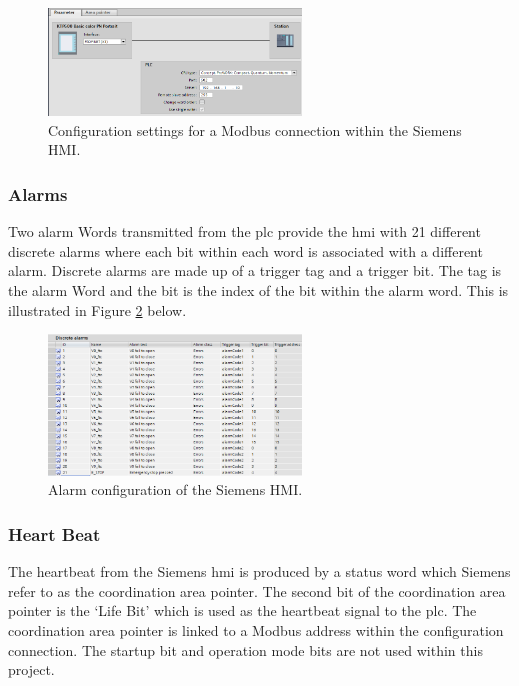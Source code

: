         \begin{figure}[H]
            \centering
            \includegraphics[width = 0.6\textwidth]{2_images/modbusHmiConfig}
            \caption{Configuration settings for a Modbus connection within the Siemens HMI.}
            \label{fig:modbusHmiConfig}
        \end{figure}        
        
        \subsubsection{Alarms}
            Two alarm Words transmitted from the \acrshort{plc} provide the \acrshort{hmi} with 21 different discrete alarms where each bit within each word is associated with a different alarm. Discrete alarms are made up of a trigger tag and a trigger bit. The tag is the alarm Word and the bit is the index of the bit within the alarm word. This is illustrated in Figure \ref{fig:hmiAlarms} below.

        \begin{figure}[H]
            \centering
            \includegraphics[width = 0.6\textwidth]{2_images/hmiAlarms}
            \caption{Alarm configuration of the Siemens HMI.}
            \label{fig:hmiAlarms}
        \end{figure}     
            
        \subsubsection{Heart Beat}
            The heartbeat from the Siemens \acrshort{hmi} is produced by a status word which Siemens refer to as the coordination area pointer. The second bit of the coordination area pointer is the `Life Bit' which is used as the heartbeat signal to the \acrshort{plc}. The coordination area pointer is linked to a Modbus address within the configuration connection.
            The startup bit and operation mode bits are not used within this project. 

